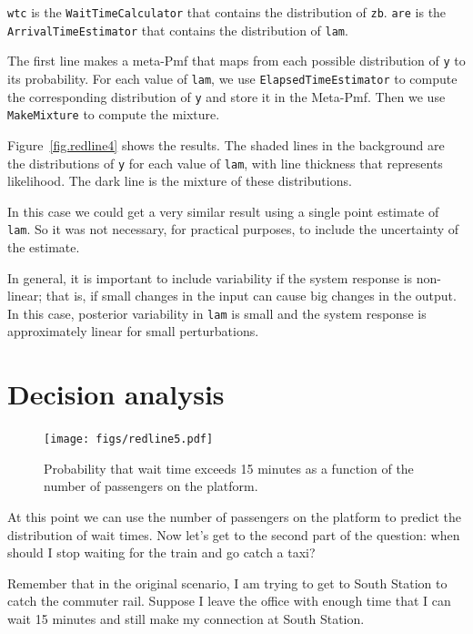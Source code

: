 \documentclass[12pt]{book}
\theoremstyle{exercise}
\newcommand{\py}[1]{{\tt #1}}%
\begin{document}
\py{wtc} is the \py{WaitTimeCalculator} that contains the
distribution of \py{zb}.  \py{are} is the \py{ArrivalTimeEstimator}
that contains the distribution of \py{lam}.

The first line makes a meta-Pmf that maps from each possible
distribution of \py{y} to its probability.  For each value
of \py{lam}, we use \py{ElapsedTimeEstimator} to
compute the corresponding distribution of
\py{y} and store it in the Meta-Pmf.  Then
we use \py{MakeMixture} to compute the mixture.


Figure~\ref{fig.redline4} shows the results.  The shaded lines
in the background are the distributions of \py{y} for each value
of \py{lam}, with line thickness that represents likelihood.
The dark line is the mixture of these distributions.

In this case we could get a very similar result using a single point
estimate of \py{lam}.  So it was not necessary, for practical purposes,
to include the uncertainty of the estimate.

In general, it is important to include variability if the system
response is non-linear; that is, if small changes in the input can
cause big changes in the output.  In this case, posterior variability
in \py{lam} is small and the system response is approximately
linear for small perturbations.


\section{Decision analysis}

\begin{figure}
\centerline{\texttt{[image: figs/redline5.pdf]}}
\caption{Probability that wait time exceeds 15 minutes as
a function of the number of passengers on the platform. }
\label{fig.redline5}
\end{figure}

At this point we can use the number of passengers on the platform
to predict the distribution of wait times.  Now
let's get to the second part of the question: when should I stop
waiting for the train and go catch a taxi?

Remember that in the original scenario, I am trying to get to
South Station to catch the commuter rail.  Suppose I leave
the office with enough time that I can wait 15 minutes
and still make my connection at South Station.
\end{document}
